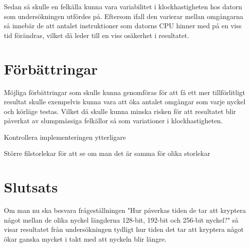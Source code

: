 Sedan så skulle en felkälla kunna vara variabilitet i klockhastigheten hos datorn som undersökningen utfördes på. Eftersom ifall
den varierar mellan omgångarna så innebär de att antalet instruktioner som datorns CPU hinner med på en viss tid förändras, vilket då leder till en viss osäkerhet i resultatet.


\section{Förbättringar} %
Möjliga förbättringar som skulle kunna genomföras för att få ett mer tillförlitligt resultat skulle exempelvis kunna vara att öka antalet omgångar som varje nyckel och körläge
testas. Vilket då skulle kunna minska risken för att resultatet blir påverkat av slumpmässiga felkällor så som variationer i klockhastigheten.

Kontrollera implementeringen ytterligare

Större filstorlekar för att se om man det är samma för olika storlekar

\section{Slutsats} %
Om man nu ska besvara frågeställningen "Hur påverkas tiden de tar att kryptera något mellan de olika nyckel längderna 128-bit, 192-bit och 256-bit nyckel?" så visar resultatet från
undersökningen tydligt hur tiden det tar att kryptera något ökar ganska mycket i takt med att nyckeln blir längre.
